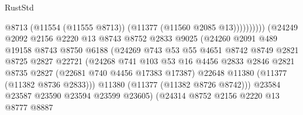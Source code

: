 \begin{lexlean}{RustStd}
\begin{coremodule}
                                              @8713
                                              (@11554 (@11555 @8713))
                                              (@11377 (@11560 @2085 @13))))))))))
                              (@24249
                                @2092
                                @2156
                                @2220
                                @13
                                @8743
                                @8752
                                @2833
                                @9025
                                (@24260
                                  @2091
                                  @489
                                  @19158
                                  @8743
                                  @8750
                                  @6188
                                  (@24269
                                    @743
                                    @53
                                    @55
                                    @4651
                                    @8742
                                    @8749
                                    @2821
                                    @8725
                                    @2827
                                    @22721
                                    (@24268
                                      @741
                                      @103
                                      @53
                                      @16
                                      @4456
                                      @2833
                                      @2846
                                      @2821
                                      @8735
                                      @2827
                                      (@22681 @740 @4456 @17383 @17387)
                                      @22648
                                      @11380
                                      (@11377 (@11382 @8736 @2833)))
                                    @11380
                                    (@11377 (@11382 @8726 @8742)))
                                  @23584
                                  @23587
                                  @23590
                                  @23594
                                  @23599
                                  @23605)
                                (@24314
                                  @8752
                                  @2156
                                  @2220
                                  @13
                                  @8777
                                  @8887

\end{coremodule}
\end{lexlean}

